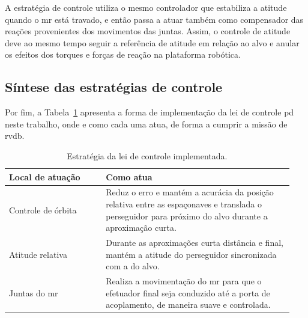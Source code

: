 A estratégia de controle utiliza o mesmo controlador que estabiliza a atitude quando o \gls{mr} está travado, e então passa a atuar também como compensador das reações provenientes dos movimentos das juntas.
Assim, o controle de atitude deve ao mesmo tempo seguir a referência de atitude em relação ao alvo e anular os efeitos dos torques e forças de reação na plataforma robótica.


\subsection{Síntese das estratégias de controle}


Por fim, a Tabela~\ref{tab:locais_atuacao_controladores} apresenta a forma de implementação da lei de controle \gls{pd} neste trabalho, onde e como cada uma atua, de forma a cumprir a missão de \gls{rvdb}.

\begin{table}[H]
\centering
\caption{Estratégia da lei de controle implementada.}
\label{tab:locais_atuacao_controladores}
\begin{tabular}{p{0.32\linewidth} p{0.62\linewidth}}
\hline
\textbf{Local de atuação} & \textbf{Como atua} \\
\hline
Controle de órbita &
Reduz o erro e mantém a acurácia da posição relativa entre as espaçonaves e translada o perseguidor para próximo do alvo durante a aproximação curta. \\
\hline
Atitude relativa &
Durante as aproximações curta distância e final, mantém a atitude do perseguidor sincronizada com a do alvo. \\
\hline
Juntas do \gls{mr} &
Realiza a movimentação do \gls{mr} para que o efetuador final seja conduzido até a porta de acoplamento, de maneira suave e controlada. \\
\hline
\end{tabular}
\end{table}